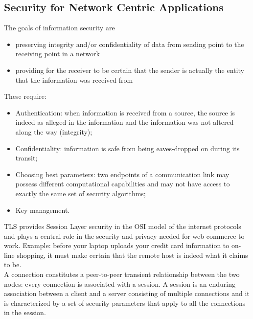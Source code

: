 \documentclass[a4paper, 10pt, titlepage]{article}
\begin{document}
\subsection{Security for Network Centric Applications}
The goals of information security are
\begin{itemize}
\item preserving integrity and/or confidentiality of data from sending point to the receiving point in a network
\item providing for the receiver to be certain that the sender is actually the entity that the information was received from
\end{itemize} 
These require:
\begin{itemize}
\item Authentication: when information is received from a source, the source is indeed as alleged in the information and the information was not altered along the way (integrity);
\item Confidentiality: information is safe from being eaves-dropped on during its transit;
\item Choosing best parameters: two endpoints of a communication link may possess different computational capabilities and may not
have access to exactly the same set of security algorithms;
\item Key management.
\end{itemize}
TLS provides Session Layer security in the OSI model of the internet protocols and plays a central role in the security and privacy needed for web commerce to work. Example: before your laptop uploads your credit card information to on-line shopping, it must make certain that the remote host is indeed what it claims to be. \medskip\\
A connection constitutes a peer-to-peer transient relationship between the two nodes: every connection is associated with a session. A session is an enduring association between a client and a server consisting of multiple connections and it is characterized by a set of security parameters that apply to all the connections in the session.
\end{document}
